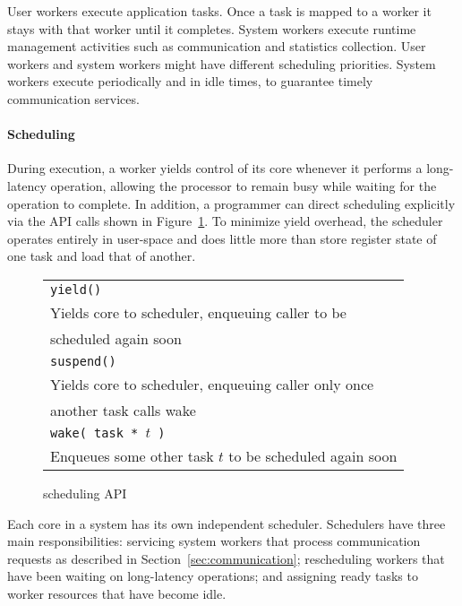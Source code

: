 User workers execute application tasks. Once a task is mapped to a worker it
stays with that worker until it completes. System workers execute runtime
management activities such as communication and statistics collection. User
workers and system workers might have different scheduling priorities. System
workers execute periodically and in idle times, to guarantee timely
communication services.

\paragraph{Scheduling} 
During execution, a worker yields control of its core whenever it performs a
long-latency operation, allowing the processor to remain busy while waiting
for the operation to complete. In addition, a programmer can direct scheduling
explicitly via the \Grappa API calls shown in Figure~\ref{fig:scheduling}. To
minimize yield overhead, the \Grappa scheduler operates entirely in user-space
and does little more than store register state of one task and load that of
another.

\begin{figure}[htbp]
  \begin{center}
	\begin{tabular}{l}
    \texttt{\scriptsize yield() } \\
      Yields core to scheduler, enqueuing caller to be \\ scheduled again soon \\
    \texttt{\scriptsize suspend() }  \\
      Yields core to scheduler, enqueuing caller only once \\ another task calls wake \\
    \texttt{\scriptsize wake( task * $t$ ) } \\
      Enqueues some other task $t$ to be scheduled again soon \\
	\end{tabular}
    \begin{minipage}{0.95\columnwidth}
      \caption{\label{fig:scheduling} \Grappa scheduling API } 
    \end{minipage}
  \end{center}
\end{figure}

Each core in a \Grappa system has its own independent scheduler. Schedulers
have three main responsibilities: servicing system workers that process
communication requests as described in Section~\ref{sec:communication};
rescheduling workers that have been waiting on long-latency operations; and
assigning ready tasks to worker resources that have become idle.

